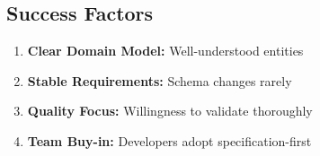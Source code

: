 \subsection{Success Factors}

\begin{enumerate}
    \item \textbf{Clear Domain Model:} Well-understood entities
    \item \textbf{Stable Requirements:} Schema changes rarely
    \item \textbf{Quality Focus:} Willingness to validate thoroughly
    \item \textbf{Team Buy-in:} Developers adopt specification-first
\end{enumerate}
